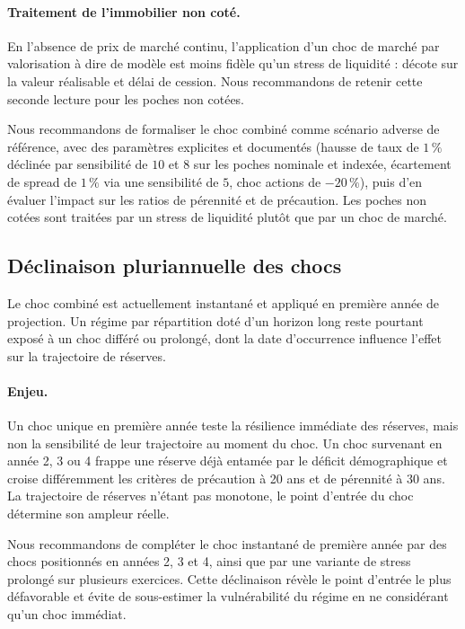 \documentclass[11pt,a4paper]{article}
\begin{document}
\paragraph{Traitement de l'immobilier non coté.} En l'absence de prix de marché continu, l'application d'un choc de marché par valorisation à dire de modèle est moins fidèle qu'un stress de liquidité : décote sur la valeur réalisable et délai de cession. Nous recommandons de retenir cette seconde lecture pour les poches non cotées.

\begin{insightbox}
Nous recommandons de formaliser le choc combiné comme scénario adverse de référence, avec des paramètres explicites et documentés (hausse de taux de $1\,\%$ déclinée par sensibilité de $10$ et $8$ sur les poches nominale et indexée, écartement de spread de $1\,\%$ via une sensibilité de $5$, choc actions de $-20\,\%$), puis d'en évaluer l'impact sur les ratios de pérennité et de précaution. Les poches non cotées sont traitées par un stress de liquidité plutôt que par un choc de marché.
\end{insightbox}

\subsection{Déclinaison pluriannuelle des chocs}

Le choc combiné est actuellement instantané et appliqué en première année de projection. Un régime par répartition doté d'un horizon long reste pourtant exposé à un choc différé ou prolongé, dont la date d'occurrence influence l'effet sur la trajectoire de réserves.

\paragraph{Enjeu.} Un choc unique en première année teste la résilience immédiate des réserves, mais non la sensibilité de leur trajectoire au moment du choc. Un choc survenant en année 2, 3 ou 4 frappe une réserve déjà entamée par le déficit démographique et croise différemment les critères de précaution à 20 ans et de pérennité à 30 ans. La trajectoire de réserves n'étant pas monotone, le point d'entrée du choc détermine son ampleur réelle.

\begin{insightbox}
Nous recommandons de compléter le choc instantané de première année par des chocs positionnés en années 2, 3 et 4, ainsi que par une variante de stress prolongé sur plusieurs exercices. Cette déclinaison révèle le point d'entrée le plus défavorable et évite de sous-estimer la vulnérabilité du régime en ne considérant qu'un choc immédiat.
\end{insightbox}
\end{document}
